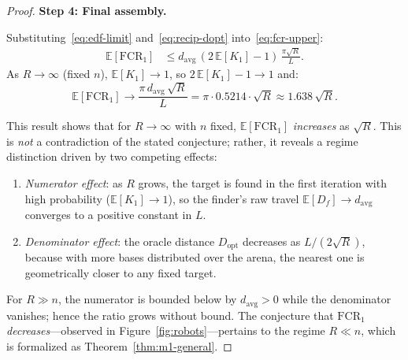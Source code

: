 \begin{proof}
\medskip
\noindent\textbf{Step 4: Final assembly.}

Substituting~\eqref{eq:edf-limit} and~\eqref{eq:recip-dopt}
into~\eqref{eq:fcr-upper}:
\begin{align}
  \mathbb{E}[\mathrm{FCR}_1]
  &\leq d_{\mathrm{avg}}\,(2\,\mathbb{E}[K_1]-1)\,
        \frac{\pi\sqrt{R}}{L}.
  \label{eq:fcr1-final}
\end{align}
As $R \to \infty$ (fixed $n$), $\mathbb{E}[K_1] \to 1$, so
$2\,\mathbb{E}[K_1]-1 \to 1$ and:
\begin{equation}
  \mathbb{E}[\mathrm{FCR}_1] \to \frac{\pi\,d_{\mathrm{avg}}\,\sqrt{R}}{L}
  = \pi \cdot 0.5214 \cdot \sqrt{R}
  \approx 1.638\,\sqrt{R}.
\end{equation}

This result shows that for $R \to \infty$ with $n$ fixed, $\mathbb{E}[\mathrm{FCR}_1]$
\emph{increases} as $\sqrt{R}$.
This is \emph{not} a contradiction of the stated conjecture; rather, it reveals
a regime distinction driven by two competing effects:
\begin{enumerate}
  \item \emph{Numerator effect}: as $R$ grows, the target is found in the
    first iteration with high probability ($\mathbb{E}[K_1] \to 1$), so
    the finder's raw travel $\mathbb{E}[D_f] \to d_{\mathrm{avg}}$
    converges to a positive constant in $L$.
  \item \emph{Denominator effect}: the oracle distance $D_{\mathrm{opt}}$
    decreases as $L/(2\sqrt{R})$, because with more bases distributed over
    the arena, the nearest one is geometrically closer to any fixed target.
\end{enumerate}
For $R \gg n$, the numerator is bounded below by $d_{\mathrm{avg}} > 0$
while the denominator vanishes; hence the ratio grows without bound.
The conjecture that $\mathrm{FCR}_1$ \emph{decreases}---observed in
Figure~\ref{fig:robots}---pertains to the regime $R \ll n$, which is
formalized as Theorem~\ref{thm:m1-general}.
\end{proof}

